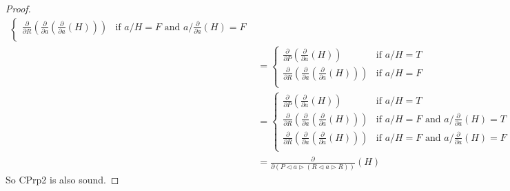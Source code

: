 \documentclass[a4paper,twoside,openright]{report}
\newcommand{\dd}[1]{\frac{\partial}{\partial #1}}
\newcommand{\lef}{\ensuremath{\triangleleft}}
\newcommand{\rig}{\ensuremath{\triangleright}}
\begin{document}
\begin{proof}
\begin{align*}
\begin{cases}
\dd R(\dd a(\dd a(H))) & \text{if $a/H=F$ and $a/\dd a(H)=F$}\\
\end{cases}\\
&=\begin{cases}
\dd P(\dd a(H)) & \text{if $a/H=T$}\\
\dd R(\dd a(\dd a(H))) & \text{if $a/H=F$}\\
\end{cases}\\
&=\begin{cases}
\dd P(\dd a(H)) & \text{if $a/H=T$}\\
\dd R(\dd a(\dd a(H))) & \text{if $a/H=F$ and $a/\dd a(H)=T$}\\
\dd R(\dd a(\dd a(H))) & \text{if $a/H=F$ and $a/\dd a(H)=F$}\\
\end{cases}\\
&=\dd{(P\lef a\rig(R\lef a\rig R))}(H)
\end{align*}
So CPrp2 is also sound.
\end{proof}
\end{document}

